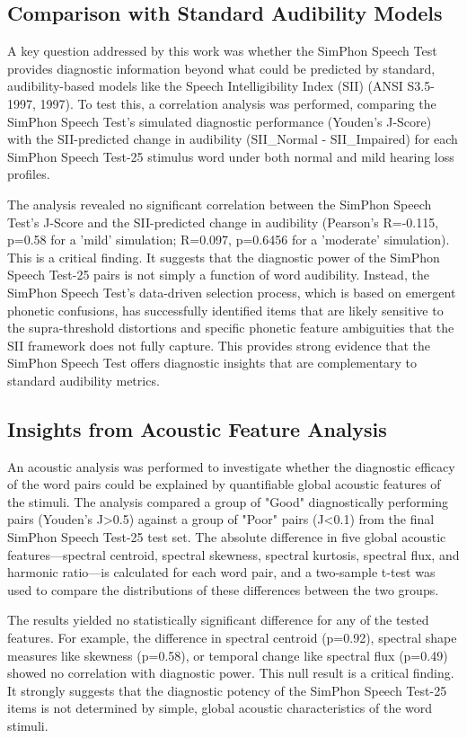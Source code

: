 \documentclass{article}
\begin{document}
\subsection{Comparison with Standard Audibility Models}
A key question addressed by this work was whether the SimPhon Speech Test provides diagnostic information beyond what could be predicted by standard, audibility-based models like the Speech Intelligibility Index (SII) (ANSI S3.5-1997, 1997). To test this, a correlation analysis was performed, comparing the SimPhon Speech Test's simulated diagnostic performance (Youden's J-Score) with the SII-predicted change in audibility (SII\_Normal - SII\_Impaired) for each SimPhon Speech Test-25 stimulus word under both normal and mild hearing loss profiles.

The analysis revealed no significant correlation between the SimPhon Speech Test's J-Score and the SII-predicted change in audibility (Pearson's R=-0.115, p=0.58 for a 'mild' simulation; R=0.097, p=0.6456 for a 'moderate' simulation). This is a critical finding. It suggests that the diagnostic power of the SimPhon Speech Test-25 pairs is not simply a function of word audibility. Instead, the SimPhon Speech Test's data-driven selection process, which is based on emergent phonetic confusions, has successfully identified items that are likely sensitive to the supra-threshold distortions and specific phonetic feature ambiguities that the SII framework does not fully capture. This provides strong evidence that the SimPhon Speech Test offers diagnostic insights that are complementary to standard audibility metrics.

\subsection{Insights from Acoustic Feature Analysis}
An acoustic analysis was performed to investigate whether the diagnostic efficacy of the word pairs could be explained by quantifiable global acoustic features of the stimuli. The analysis compared a group of "Good" diagnostically performing pairs (Youden's J>0.5) against a group of "Poor" pairs (J<0.1) from the final SimPhon Speech Test-25 test set. The absolute difference in five global acoustic features---spectral centroid, spectral skewness, spectral kurtosis, spectral flux, and harmonic ratio---is calculated for each word pair, and a two-sample t-test was used to compare the distributions of these differences between the two groups.

The results yielded no statistically significant difference for any of the tested features. For example, the difference in spectral centroid (p=0.92), spectral shape measures like skewness (p=0.58), or temporal change like spectral flux (p=0.49) showed no correlation with diagnostic power. This null result is a critical finding. It strongly suggests that the diagnostic potency of the SimPhon Speech Test-25 items is not determined by simple, global acoustic characteristics of the word stimuli.
\end{document}
